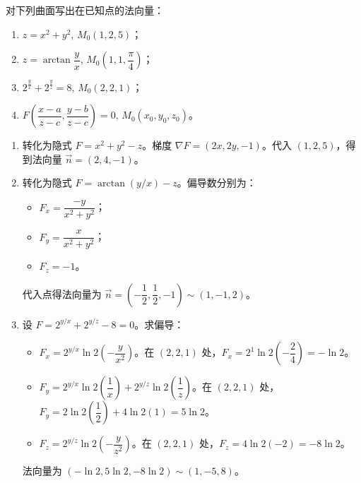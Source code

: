 \documentclass[lang=cn,11pt]{elegantbook}
\begin{document}
\begin{exercise}[曲面法向量的求解]
对下列曲面写出在已知点的法向量：
\begin{enumerate}
    \item[(1)] $z=x^2+y^2,\,M_0(1,2,5)$；
    \item[(2)] $z=\arctan\dfrac{y}{x},\,M_0\left(1,1,\dfrac{\pi}{4}\right)$；
    \item[(3)] $2^{\frac{y}{x}}+2^{\frac{y}{z}}=8,\,M_0(2,2,1)$；
    \item[(4)] $F\left(\dfrac{x-a}{z-c},\dfrac{y-b}{z-c}\right)=0,\,M_0(x_0,y_0,z_0)$。
\end{enumerate}
\end{exercise}
\begin{solution}
\begin{enumerate}
    \item[(1)] 转化为隐式 $F = x^2+y^2-z$。梯度 $\nabla F = (2x, 2y, -1)$。代入 $(1,2,5)$，得到法向量 $\vec{n} = (2, 4, -1)$。
    
    \item[(2)] 转化为隐式 $F = \arctan(y/x) - z$。偏导数分别为：
    \begin{itemize}
        \item $F_x = \dfrac{-y}{x^2+y^2}$；
        \item $F_y = \dfrac{x}{x^2+y^2}$；
        \item $F_z = -1$。
    \end{itemize}
    代入点得法向量为 $\vec{n} = \left(-\dfrac{1}{2}, \dfrac{1}{2}, -1\right) \sim (1, -1, 2)$。
    
    \item[(3)] 设 $F = 2^{y/x}+2^{y/z}-8 = 0$。求偏导：
    \begin{itemize}
        \item $F_x = 2^{y/x}\ln 2 \left(-\dfrac{y}{x^2}\right)$。在 $(2,2,1)$ 处，$F_x = 2^1 \ln 2 \left(-\dfrac{2}{4}\right) = -\ln 2$。
        \item $F_y = 2^{y/x}\ln 2 \left(\dfrac{1}{x}\right) + 2^{y/z}\ln 2 \left(\dfrac{1}{z}\right)$。在 $(2,2,1)$ 处，$F_y = 2 \ln 2 \left(\dfrac{1}{2}\right) + 4 \ln 2 (1) = 5\ln 2$。
        \item $F_z = 2^{y/z}\ln 2 \left(-\dfrac{y}{z^2}\right)$。在 $(2,2,1)$ 处，$F_z = 4 \ln 2 (-2) = -8\ln 2$。
    \end{itemize}
    法向量为 $(-\ln 2, 5\ln 2, -8\ln 2) \sim (1, -5, 8)$。
    

\end{enumerate}
\end{solution}
\end{document}
